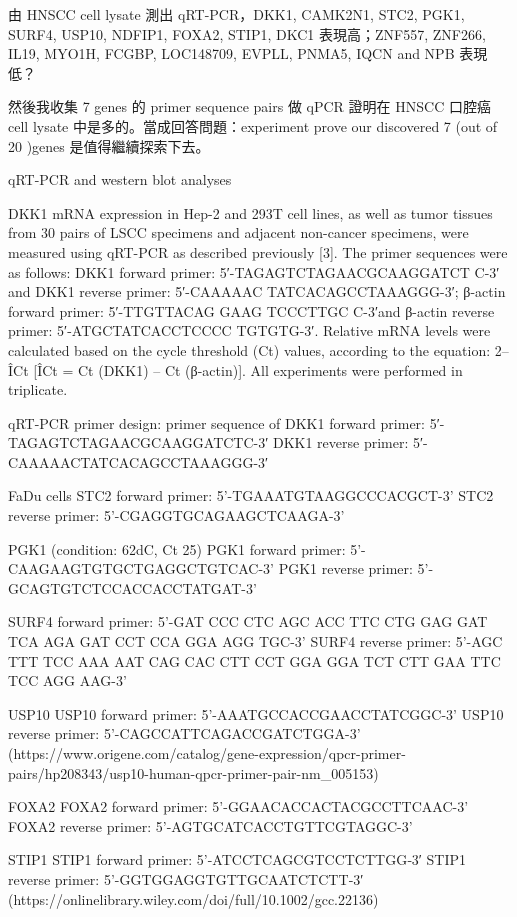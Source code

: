 \documentclass[preprint,12pt]{elsarticle}
\newenvironment{MyColorPar}[1]{%
    \leavevmode\color{#1}\ignorespaces%
}{%
}%
\begin{document}
\begin{MyColorPar}{blue}
由 HNSCC cell lysate 測出 qRT-PCR，DKK1, CAMK2N1, STC2, PGK1, SURF4, USP10, NDFIP1, FOXA2, STIP1, DKC1 表現高；ZNF557, ZNF266, IL19, MYO1H, FCGBP, LOC148709, EVPLL, PNMA5, IQCN and NPB 表現低？

然後我收集 7 genes 的 primer sequence pairs
做 qPCR 證明在 HNSCC 口腔癌 cell lysate 中是多的。當成回答問題：experiment prove our discovered 7 (out of 20 )genes 是值得繼續探索下去。

qRT-PCR and western blot analyses

DKK1 mRNA expression in Hep-2 and 293T cell lines, as well as tumor tissues from 30 pairs of LSCC specimens and adjacent non-cancer specimens, were measured using qRT-PCR as described previously [3]. The primer sequences were as follows: DKK1 forward primer: 5′-TAGAGTCTAGAACGCAAGGATCT C-3′ and DKK1 reverse primer: 5′-CAAAAAC TATCACAGCCTAAAGGG-3′; β-actin forward primer: 5′-TTGTTACAG GAAG TCCCTTGC C-3′and β-actin reverse primer: 5′-ATGCTATCACCTCCCC TGTGTG-3′. Relative mRNA levels were calculated based on the cycle threshold (Ct) values, according to the equation: 2–ÎCt [ÎCt = Ct (DKK1) – Ct (β-actin)]. All experiments were performed in triplicate.


qRT-PCR primer design: primer sequence of
DKK1 forward primer: 5′-TAGAGTCTAGAACGCAAGGATCTC-3′
DKK1 reverse primer: 5′-CAAAAACTATCACAGCCTAAAGGG-3′

FaDu cells
STC2 forward primer: 5'-TGAAATGTAAGGCCCACGCT-3'
STC2 reverse primer: 5'-CGAGGTGCAGAAGCTCAAGA-3'

PGK1 (condition: 62dC, Ct 25)
PGK1 forward primer: 5'-CAAGAAGTGTGCTGAGGCTGTCAC-3'
PGK1 reverse primer: 5'-GCAGTGTCTCCACCACCTATGAT-3'

SURF4 forward primer: 5'-GAT CCC CTC AGC ACC TTC CTG GAG GAT TCA AGA GAT CCT CCA GGA AGG TGC-3'
SURF4  reverse primer: 5'-AGC TTT TCC AAA AAT CAG CAC CTT CCT GGA GGA TCT CTT GAA TTC TCC AGG AAG-3'

USP10
USP10  forward primer: 5'-AAATGCCACCGAACCTATCGGC-3'
USP10 reverse primer: 5'-CAGCCATTCAGACCGATCTGGA-3'
(https://www.origene.com/catalog/gene-expression/qpcr-primer-pairs/hp208343/usp10-human-qpcr-primer-pair-nm_005153)

FOXA2
FOXA2 forward primer: 5'-GGAACACCACTACGCCTTCAAC-3'
FOXA2 reverse primer: 5'-AGTGCATCACCTGTTCGTAGGC-3'

STIP1
STIP1 forward primer: 5'-ATCCTCAGCGTCCTCTTGG‐3′
STIP1 reverse primer: 5'-GGTGGAGGTGTTGCAATCTCTT‐3′
(https://onlinelibrary.wiley.com/doi/full/10.1002/gcc.22136)\cite{Cho2014}



\end{MyColorPar}
\end{document}
